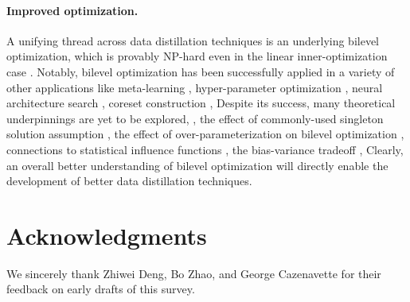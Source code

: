 \documentclass[10pt]{article} %
\begin{document}
\paragraph{Improved optimization.} A unifying thread across data distillation techniques is an underlying bilevel optimization, which is provably NP-hard even in the linear inner-optimization case \citep{bilevel_np_hard}. Notably, bilevel optimization has been successfully applied in a variety of other applications like meta-learning \citep{maml, metasgd}, hyper-parameter optimization \citep{hyperopt_maclaurin, hyperopt_vicol}, neural architecture search \citep{darts_nas}, coreset construction \citep{bilevel_coresets, bilevel_coresets_bayesian}, \etc Despite its success, many theoretical underpinnings are yet to be explored, \eg, the effect of commonly-used singleton solution assumption \citep{singleton_bilevel}, the effect of over-parameterization on bilevel optimization \citep{bilevel_implicit_bias}, connections to statistical influence functions \citep{influence_functions}, the bias-variance tradeoff \citep{bilevel_bias_variance}, \etc Clearly, an overall better understanding of bilevel optimization will directly enable the development of better data distillation techniques.

\section*{Acknowledgments}
We sincerely thank Zhiwei Deng, Bo Zhao, and George Cazenavette for their feedback on early drafts of this survey.

{\small
}


\appendix


\end{document}
